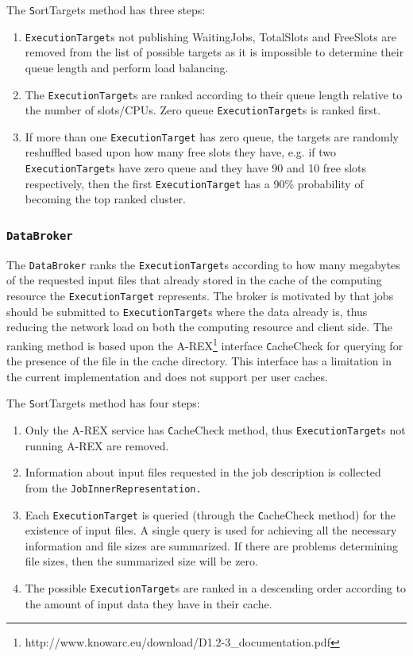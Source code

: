 \documentclass{book}
\newcommand{\DataBroker}{\texttt{DataBroker}}
\newcommand{\ExecutionTarget}{\texttt{ExecutionTarget}}
\begin{document}
The {\texttt SortTargets} method has three steps:

\begin{enumerate}
\item{{\ExecutionTarget}s not publishing WaitingJobs, TotalSlots and FreeSlots are removed from the list of possible targets 
as it is impossible to determine their queue length and perform load balancing.}
\item{The {\ExecutionTarget}s are ranked according to their queue length relative to the number of slots/CPUs. Zero queue 
{\ExecutionTarget}s is ranked first.}
\item{If more than one {\ExecutionTarget} has zero queue, the targets are randomly reshuffled based upon how many free slots 
they have, e.g. if two {\ExecutionTarget}s have zero queue and they have 90 and 10 free slots respectively, then the first
{\ExecutionTarget} has a 90\% probability of becoming the top ranked cluster.}
\end{enumerate}

\subsubsection{\DataBroker}

The {\DataBroker} ranks the {\ExecutionTarget}s according to how many megabytes of the requested input files that already 
stored in the cache of the computing resource the {\ExecutionTarget} represents. The broker is motivated by that jobs should 
be submitted to {\ExecutionTarget}s where the data already is, thus reducing the network load on both the computing resource 
and client side. The ranking method is based upon the A-REX\footnote{http://www.knowarc.eu/download/D1.2-3\_documentation.pdf} 
interface {\texttt CacheCheck} for querying for the presence of the file in the cache directory. This interface has a limitation 
in the current implementation and does not support per user caches.

The {\texttt SortTargets} method has four steps:

\begin{enumerate}
\item{Only the A-REX service has {\texttt CacheCheck} method, thus {\ExecutionTarget}s not running A-REX are removed.}
\item{Information about input files requested in the job description is collected from the \texttt{JobInnerRepresentation.}}
\item{Each {\ExecutionTarget} is queried (through the {\texttt CacheCheck} method) for the existence of input files. 
A single query is used for achieving all the necessary information and file sizes are summarized. If there are problems 
determining file sizes, then the summarized size will be zero.}
\item{The possible {\ExecutionTarget}s are ranked in a descending order according to the amount of input data they have in their cache.}
\end{enumerate}
\end{document}
